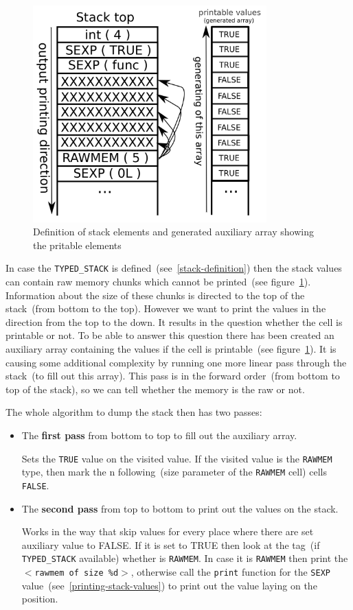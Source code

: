 \documentclass[thesis=M,english]{FITthesis}[2018/10/20]
\newcommand{\code}[1]{\texttt{#1}}
\begin{document}
\begin{figure}[h!]
	\includegraphics[width=90mm]{stack-rawmem.png}
	\caption{Definition of stack elements and generated auxiliary array showing the pritable elements}\label{fig:stack-elements-definition}
\end{figure}

In case the \code{TYPED{\_}STACK} is defined~(see~\ref{stack-definition}) then the stack values can contain raw memory chunks which cannot be printed~(see figure~\ref{fig:stack-elements-definition}). Information about the size of these chunks is directed to the top of the stack~(from bottom to the top). However we want to print the values in the direction from the top to the down. It results in the question whether the cell is printable or not. To be able to answer this question there has been created an auxiliary array containing the values if the cell is printable~(see figure~\ref{fig:stack-elements-definition}). It is causing some additional complexity by running one more linear pass through the stack~(to fill out this array). This pass is in the forward order~(from bottom to top of the stack), so we can tell whether the memory is the raw or not.

The whole algorithm to dump the stack then has two passes:

\begin{itemize}
	\item The \textbf{first pass} from bottom to top to fill out the auxiliary array.

			Sets the \code{TRUE} value on the visited value. If the visited value is the \code{RAWMEM} type, then mark the n following~(size parameter of the \code{RAWMEM} cell) cells \code{FALSE}.

	\item The \textbf{second pass} from top to bottom to print out the values on the stack.

			Works in the way that skip values for every place where there are set auxiliary value to FALSE. If it is set to TRUE then look at the tag~(if \code{TYPED{\_}STACK} available) whether is \code{RAWMEM}. In case it is \code{RAWMEM} then print the \code{$<$rawmem of size \%d$>$}, otherwise call the \code{print} function for the \code{SEXP} value~(see~\ref{printing-stack-values}) to print out the value laying on the position.
\end{itemize}
\end{document}

